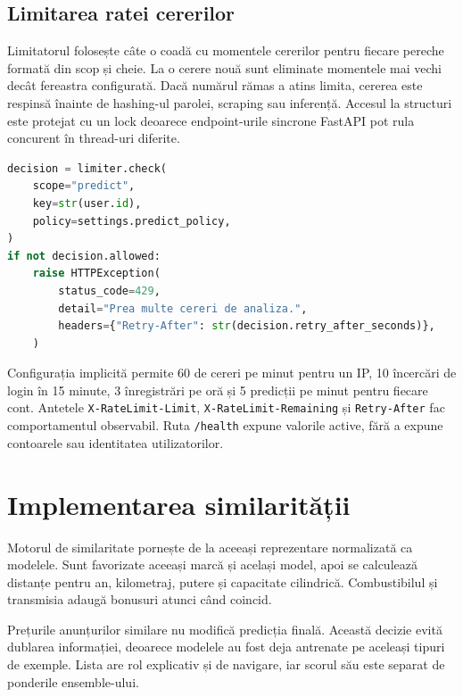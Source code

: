 \subsection{Limitarea ratei cererilor}

Limitatorul folosește câte o coadă cu momentele cererilor pentru fiecare pereche formată din scop și cheie. La o cerere nouă sunt eliminate momentele mai vechi decât fereastra configurată. Dacă numărul rămas a atins limita, cererea este respinsă înainte de hashing-ul parolei, scraping sau inferență. Accesul la structuri este protejat cu un lock deoarece endpoint-urile sincrone FastAPI pot rula concurent în thread-uri diferite.

\begin{lstlisting}[language=Python,caption={Verificarea unei limite cu fereastră glisantă},label={lst:rate-limit}]
decision = limiter.check(
    scope="predict",
    key=str(user.id),
    policy=settings.predict_policy,
)
if not decision.allowed:
    raise HTTPException(
        status_code=429,
        detail="Prea multe cereri de analiza.",
        headers={"Retry-After": str(decision.retry_after_seconds)},
    )
\end{lstlisting}

Configurația implicită permite 60 de cereri pe minut pentru un IP, 10 încercări de login în 15 minute, 3 înregistrări pe oră și 5 predicții pe minut pentru fiecare cont. Antetele \texttt{X-RateLimit-Limit}, \texttt{X-RateLimit-Remaining} și \texttt{Retry-After} fac comportamentul observabil. Ruta \texttt{/health} expune valorile active, fără a expune contoarele sau identitatea utilizatorilor.

\section{Implementarea similarității}
\label{sec:implementation-similarity}

Motorul de similaritate pornește de la aceeași reprezentare normalizată ca modelele. Sunt favorizate aceeași marcă și același model, apoi se calculează distanțe pentru an, kilometraj, putere și capacitate cilindrică. Combustibilul și transmisia adaugă bonusuri atunci când coincid.

Prețurile anunțurilor similare nu modifică predicția finală. Această decizie evită dublarea informației, deoarece modelele au fost deja antrenate pe aceleași tipuri de exemple. Lista are rol explicativ și de navigare, iar scorul său este separat de ponderile ensemble-ului.

